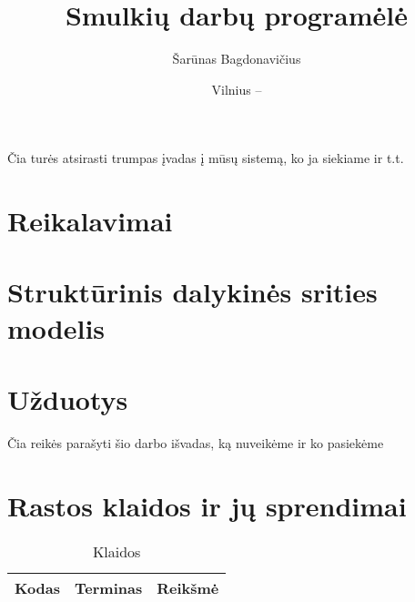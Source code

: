 \documentclass{VUMIFPSbakalaurinis}
\title{Smulkių darbų programėlė}
\author{Šarūnas Bagdonavičius}
\date{Vilnius – \the\year}
\begin{document}
\maketitle
\tableofcontents

Čia turės atsirasti trumpas įvadas į mūsų sistemą, ko ja siekiame ir t.t.

\section{Reikalavimai}

\section{Struktūrinis dalykinės srities modelis}

\section{Užduotys}

Čia reikės parašyti šio darbo išvadas, ką nuveikėme ir ko pasiekėme

\printbibliography[heading=bibintoc]  %

\appendix
\section{Rastos klaidos ir jų sprendimai}
\begin{table}[H]\footnotesize
	\centering
	\caption{Klaidos}
	{
	\setlength{\arrayrulewidth}{0.25mm}
	{\begin{tabular}{|c|c|m{11.5cm}|} \hline
	Kodas & Terminas & Reikšmė \\
	\hline

	\hline
	\end{tabular}}
	}
	\label{tab:table example}
\end{table}
\end{document}
